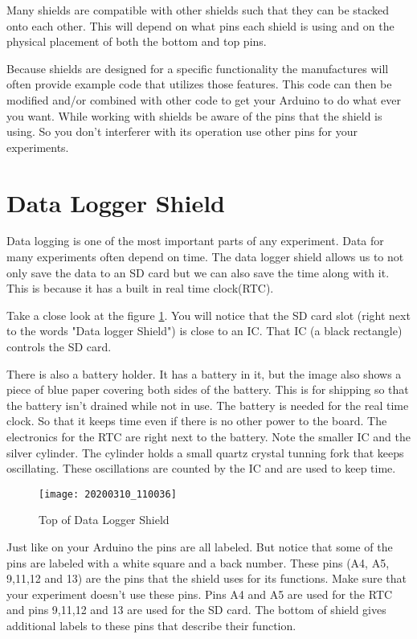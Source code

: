 	Many shields are compatible with other shields such that they can be stacked onto each other. This will depend on what pins each shield is using and on the physical placement of both the bottom and top pins.
	
	Because shields are designed for a specific functionality the manufactures will often provide example code that utilizes those features. This code can then be modified and/or combined with other code to get your Arduino to do what ever you want. While working with shields be aware of the pins that the shield is using. So you don't interferer with its operation use other pins for your experiments.

\section{Data Logger Shield}
	Data logging is one of the most important parts of any experiment. Data for many experiments often depend on time. The data logger shield allows us to not only save the data to an SD card but we can also save the time along with it. This is because it has a built in real time clock(RTC). 
	
	Take a close look at the figure \ref{Data_Logger}. You will notice that the SD card slot (right next to the words "Data logger Shield") is close to an IC. That IC (a black rectangle) controls the SD card. 
	
	There is also a battery holder. It has a battery in it, but the image also shows a piece of blue paper covering both sides of the battery. This is for shipping so that the battery isn't drained while not in use. The battery is needed for the real time clock. So that it keeps time even if there is no other power to the board. The electronics for the RTC are right next to the battery. Note the smaller IC and the silver cylinder. The cylinder holds a small quartz crystal tunning fork that keeps oscillating. These oscillations are counted by the IC and are used to keep time. 
	\begin{figure}[h!] 
		\caption{Top of Data Logger Shield}
		\label{Data_Logger}
		\texttt{[image: 20200310\_110036]}
	\end{figure}
	
	Just like on your Arduino the pins are all labeled. But notice that some of the pins are labeled with a white square and a back number. These pins (A4, A5, 9,11,12 and 13) are the pins that the shield uses for its functions. Make sure that your experiment doesn't use these pins. Pins A4 and A5 are used for the RTC and pins 9,11,12 and 13 are used for the SD card. The bottom of shield gives additional labels to these pins that describe their function. 



